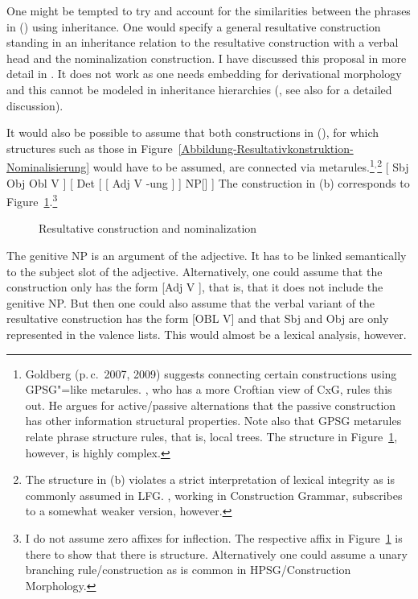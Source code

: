 One might be tempted to try and account for the similarities between the phrases in () using
inheritance. One would specify a general resultative construction standing in an inheritance relation
to the resultative construction with a verbal head and the nominalization construction. I have discussed this proposal in more detail in
. It does not work as one needs embedding for derivational morphology and this cannot be modeled
in inheritance hierarchies (, see also  for a detailed discussion).

It would also be possible to assume that both constructions  in (), for which structures such as those in
Figure~\ref{Abbildung-Resultativkonstruktion-Nominalisierung} would have to be assumed, are connected via meta\-rules.\footnote{%
  Goldberg (p.\,c.\ 2007, 2009) suggests connecting certain constructions using GPSG"=like metarules.
  \citet[]{Deppermann2006a}, who has a more Croftian view of CxG, rules this out.
 He argues for active/passive alternations that the passive construction has other information
structural properties.  Note also that GPSG metarules relate phrase
structure rules, that is, local trees. The structure in
Figure~\ref{Abbildung-Resultativkonstruktion-Nominalisierung-Construction}, however, is highly complex.
}$^,$\footnote{%
  The structure in (b) violates a strict interpretation of lexical integrity as is commonly assumed in
  LFG\indexlfg. \citet{Booij2005a,Booij2009a}, working in Construction Grammar\indexcxg, subscribes to a somewhat
  weaker version, however.%
}
\eal
\ex {}[ Sbj Obj Obl V ]
\ex {}[ Det [ [ Adj V -ung ] ] NP[] ]
\zl
The construction in (b) corresponds to
Figure~\ref{Abbildung-Resultativkonstruktion-Nominalisierung-Construction}.\footnote{%
  I do not assume zero affixes for inflection. The respective affix in
  Figure~\ref{Abbildung-Resultativkonstruktion-Nominalisierung-Construction} is there to show that
  there is structure. Alternatively one could assume a unary branching rule/construction as is
  common in HPSG/Construction Morphology.
}
\begin{figure}
\centering
{}
\caption{\label{Abbildung-Resultativkonstruktion-Nominalisierung-Construction}Resultative construction and nominalization}
\end{figure}%
The genitive NP is an argument of the adjective. It has to be linked semantically to the subject slot of the adjective.
Alternatively, one could assume that the construction only has the form [Adj V ], that
is, that it does not include the genitive NP. But then one could also assume that the verbal variant
of the resultative construction has the form [OBL V] and that Sbj and Obj are only represented in
the valence lists. This would almost be a lexical analysis, however.

